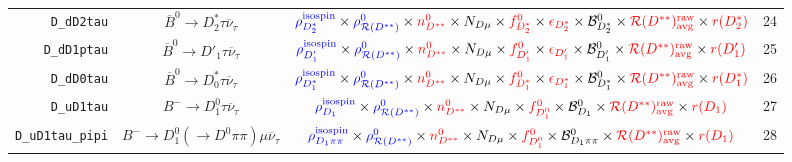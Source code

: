 \begin{landscape}
\begin{table}
\begin{tabular}{r|c|c|l}
       \texttt{D\_dD2tau} &             $\overline{B}^0 \rightarrow D^*_2 \tau \overline{\nu}_\tau$              &     $\textcolor{blue}{\rho^\text{isospin}_{D_2^*}} \times \textcolor{blue}{\rho_{\mathcal{R}(D^{**})}^0} \times \textcolor{red}{n^{0}_{D^{**}}} \times N_{D \mu} \times \textcolor{red}{f^{0}_{D_2^*}} \times \textcolor{red}{\epsilon_{D_2^*}} \times \mathcal{B}^{0}_{D_2^*} \times \textcolor{red}{\mathcal{R}(D^{**})_\text{avg}^\text{raw}} \times \textcolor{red}{r({D_2^*})}$     & 24               \\
      \texttt{D\_dD1ptau} &              $\overline{B}^0 \rightarrow D'_1 \tau \overline{\nu}_\tau$              &       $\textcolor{blue}{\rho^\text{isospin}_{D'_1}} \times \textcolor{blue}{\rho_{\mathcal{R}(D^{**})}^0} \times \textcolor{red}{n^{0}_{D^{**}}} \times N_{D \mu} \times \textcolor{red}{f^{0}_{D'_1}} \times \textcolor{red}{\epsilon_{D'_1}} \times \mathcal{B}^{0}_{D'_1} \times \textcolor{red}{\mathcal{R}(D^{**})_\text{avg}^\text{raw}} \times \textcolor{red}{r({D'_1})}$        & 25               \\
       \texttt{D\_dD0tau} &             $\overline{B}^0 \rightarrow D^*_0 \tau \overline{\nu}_\tau$              &     $\textcolor{blue}{\rho^\text{isospin}_{D_1^*}} \times \textcolor{blue}{\rho_{\mathcal{R}(D^{**})}^0} \times \textcolor{red}{n^{0}_{D^{**}}} \times N_{D \mu} \times \textcolor{red}{f^{0}_{D_1^*}} \times \textcolor{red}{\epsilon_{D_1^*}} \times \mathcal{B}^{0}_{D_1^*} \times \textcolor{red}{\mathcal{R}(D^{**})_\text{avg}^\text{raw}} \times \textcolor{red}{r({D_1^*})}$     & 26               \\
       \texttt{D\_uD1tau} &                   $B^- \rightarrow D_1^0 \tau \overline{\nu}_\tau$                   &                            $\textcolor{blue}{\rho^\text{isospin}_{D_1}} \times \textcolor{blue}{\rho_{\mathcal{R}(D^{**})}^0} \times \textcolor{red}{n^{0}_{D^{**}}} \times N_{D \mu} \times \textcolor{red}{f^{0}_{D_1^0}} \times \mathcal{B}^{0}_{D_1} \times \textcolor{red}{\mathcal{R}(D^{**})_\text{avg}^\text{raw}} \times \textcolor{red}{r({D_1})}$                             & 27               \\
 \texttt{D\_uD1tau\_pipi} &       $B^- \rightarrow D_1^0 (\rightarrow D^0 \pi\pi) \mu \overline{\nu}_\tau$       &                      $\textcolor{blue}{\rho^\text{isospin}_{D_1\pi\pi}} \times \textcolor{blue}{\rho_{\mathcal{R}(D^{**})}^0} \times \textcolor{red}{n^{0}_{D^{**}}} \times N_{D \mu} \times \textcolor{red}{f^{0}_{D_1^0}} \times \mathcal{B}^{0}_{D_1\pi\pi} \times \textcolor{red}{\mathcal{R}(D^{**})_\text{avg}^\text{raw}} \times \textcolor{red}{r({D_1})}$                       & 28               \\

\end{tabular}
\end{table}
\end{landscape}
